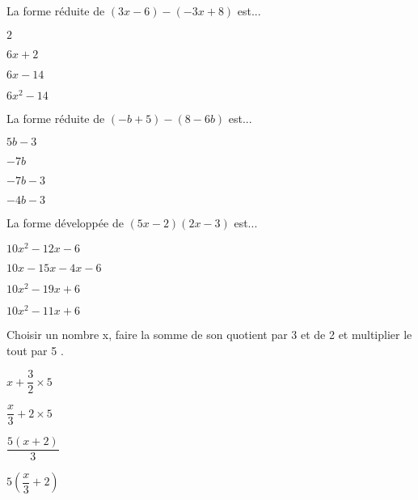 \begin{QCM}
\begin{GroupeQCM}
\begin{exercice}
La forme réduite de $(3x -6) - (-3x + 8)$ est...
\begin{ChoixQCM}{4}
\item $2$
\item $6x + 2$
\item $6x -14$
\item $6x^2 -14$
\end{ChoixQCM}

\begin{corrige}
\end{corrige}
\end{exercice}


\begin{exercice}
La forme réduite de $(-b + 5) - (8 -6b)$ est...

\begin{ChoixQCM}{4}
\item $5b -3$
\item $-7b$
\item $-7b -3$
\item $-4b -3$
\end{ChoixQCM}

\begin{corrige}
\end{corrige}
\end{exercice}


\begin{exercice}
La forme développée de $(5x -2)(2x -3)$ est...
\begin{ChoixQCM}{4}
\item $10x^2 -12x -6$
\item $10x -15x -4x -6$
\item $10x^2 -19x + 6$
\item $10x^2 -11x + 6 $
\end{ChoixQCM}

\begin{corrige}
\end{corrige}
\end{exercice}


\begin{exercice}
\og Choisir un nombre x, faire la somme de son quotient par 3 et de 2 et multiplier le tout par 5 \fg.
\begin{ChoixQCM}{4}
\item $x + \dfrac{3}{2} \times 5$
\item $\dfrac{x}{3} + 2 \times 5$
\item $\dfrac{5(x+2)}{3}$
\item $5\left(\dfrac{x}{3}+2\right)$
\end{ChoixQCM}

\begin{corrige}
\end{corrige}
\end{exercice}

\end{GroupeQCM}
\end{QCM}


